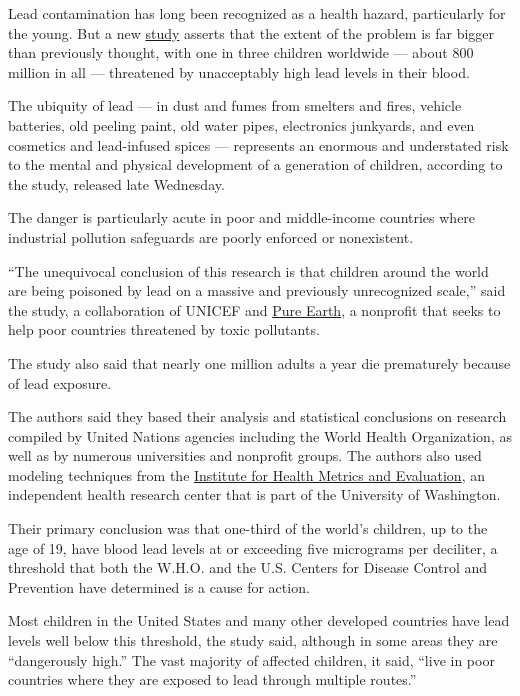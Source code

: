 Lead contamination has long been recognized as a health hazard,
particularly for the young. But a new
\href{https://www.unicef.org/reports/toxic-truth-childrens-exposure-to-lead-pollution-2020}{study}
asserts that the extent of the problem is far bigger than previously
thought, with one in three children worldwide --- about 800 million in
all --- threatened by unacceptably high lead levels in their blood.

The ubiquity of lead --- in dust and fumes from smelters and fires,
vehicle batteries, old peeling paint, old water pipes, electronics
junkyards, and even cosmetics and lead-infused spices --- represents an
enormous and understated risk to the mental and physical development of
a generation of children, according to the study, released late
Wednesday.

The danger is particularly acute in poor and middle-income countries
where industrial pollution safeguards are poorly enforced or
nonexistent.

``The unequivocal conclusion of this research is that children around
the world are being poisoned by lead on a massive and previously
unrecognized scale,'' said the study, a collaboration of UNICEF and
\href{https://www.pureearth.org/}{Pure Earth}, a nonprofit that seeks to
help poor countries threatened by toxic pollutants.

The study also said that nearly one million adults a year die
prematurely because of lead exposure.

The authors said they based their analysis and statistical conclusions
on research compiled by United Nations agencies including the World
Health Organization, as well as by numerous universities and nonprofit
groups. The authors also used modeling techniques from the
\href{http://www.healthdata.org/,}{Institute for Health Metrics and
Evaluation}, an independent health research center that is part of the
University of Washington.

Their primary conclusion was that one-third of the world's children, up
to the age of 19, have blood lead levels at or exceeding five micrograms
per deciliter, a threshold that both the W.H.O. and the U.S. Centers for
Disease Control and Prevention have determined is a cause for action.

Most children in the United States and many other developed countries
have lead levels well below this threshold, the study said, although in
some areas they are ``dangerously high.'' The vast majority of affected
children, it said, ``live in poor countries where they are exposed to
lead through multiple routes.''

